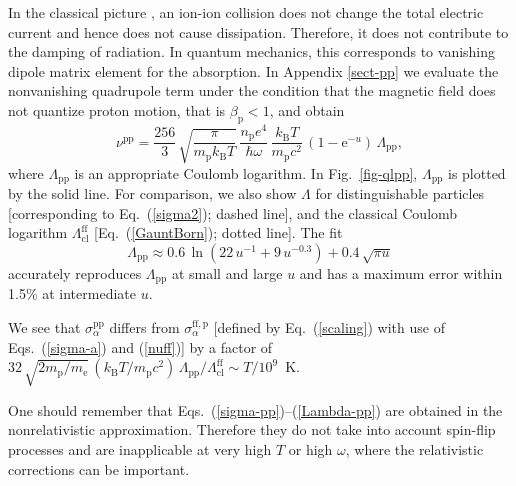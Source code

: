 \documentclass{emulateapj}
\newcommand{\beq}{\begin{equation}}
\newcommand{\eeq}{\end{equation}}
\newcommand{\req}[1]{Eq.\ (\ref{#1})}
\newcommand{\mel}{m_\mathrm{e}}
\newcommand{\mpr}{m_\mathrm{p}}
\newcommand{\kB}{k_\mathrm{B}}
\begin{document}
In the classical picture
\citep{Ginzburg}, an ion-ion 
 collision does not change
the total electric current and hence does not cause
dissipation. Therefore, it does not contribute to the damping
of radiation.
In quantum mechanics, this corresponds to vanishing
dipole matrix element for the absorption. 
In Appendix \ref{sect-pp} we evaluate the nonvanishing
quadrupole term under the condition that the magnetic field does 
not quantize proton motion, that is $\beta_\mathrm{p} < 1$, and obtain
\beq
\nu^\mathrm{pp} =  \frac{256}{3}\,\sqrt{\frac{\pi}{\mpr\kB T}}\,
   \frac{n_\mathrm{p} e^4}{\hbar\omega}\,\frac{\kB T}{\mpr c^2}\,
   (1-\mathrm{e}^{-u})\,
   \Lambda_\mathrm{pp},
\label{nupp}
\eeq
where $\Lambda_\mathrm{pp}$ is an appropriate Coulomb logarithm.
In Fig.\ \ref{fig-qlpp},
$\Lambda_\mathrm{pp}$ is plotted by the solid line.
For comparison, we also show $\Lambda$ for distinguishable
particles [corresponding to \req{sigma2}; dashed line], 
and the classical Coulomb logarithm $\Lambda_\mathrm{cl}^\mathrm{ff}$
[\req{GauntBorn}; dotted line].
The fit
\beq
   \Lambda_\mathrm{pp} \approx 0.6\,\ln(22\,u^{-1}+9\,u^{-0.3})
   +0.4\,\sqrt{\pi u}
\label{Lambda-pp}
\eeq
accurately reproduces $\Lambda_\mathrm{pp}$ at small and large $u$
and has a maximum error within 1.5\% at intermediate $u$.

We see that $\sigma_\alpha^\mathrm{pp}$
differs from $\sigma_\alpha^\mathrm{ff,p}$
[defined by \req{scaling} with use of Eqs.\ (\ref{sigma-a})
and (\ref{nuff})]
by a factor of
$32\,\sqrt{2\mpr/\mel}\,(\kB T/\mpr c^2 )\,
\Lambda_\mathrm{pp}/\Lambda_\mathrm{cl}^\mathrm{ff}
\sim T/10^9$~K.

One should remember that Eqs.\ (\ref{sigma-pp})--(\ref{Lambda-pp})
are obtained in the nonrelativistic approximation.
Therefore they do not take into account spin-flip processes
and are inapplicable
at very high $T$ or high $\omega$, where the relativistic 
corrections can be important.

\end{document}

